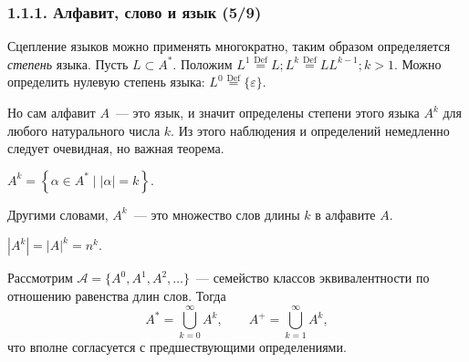 \documentclass[mathserif,12pt,aspectratio=169]{beamer}
\renewcommand{\index}[1]{}
\def\odmkey#1#2{{\it\color{red} #1}\index{#2}}
\def\Set#1#2{\left\{ #1 \mid #2 \right\}}
\def\Def{\stackrel{\text{Def}}{=}}
\let\cal\mathcal
\begin{document}
\begin{frame}
\frametitle{1.1.1. Алфавит, слово и язык (5/9)}
Сцепление языков можно применять многократно,
таким образом определяется \odmkey{степень}{Степень!слова} языка. Пусть $L\subset A^*$. Положим
$L^1 \Def L; L^k\Def L L^{k-1}; k>1$. Можно 
определить нулевую степень языка:
$L^0 \Def \{\varepsilon\}$.

Но сам алфавит $A$~--- это язык,
и значит определены степени этого языка $A^k$
для любого натурального числа $k$. 
Из этого наблюдения и определений
немедленно следует очевидная, 
но важная теорема.

\begin{theorem}
$A^k=\Set{\alpha\in A^*}{|\alpha|=k}$.
\end{theorem}

\begin{remark}
Другими словами, $A^k$~--- это множество слов длины $k$ в алфавите $A$.
\end{remark}

\begin{corollary}
$|A^k|=|A|^k =n^k.$
\end{corollary} 

Рассмотрим $\cal{A} = \{ A^0, A^1, A^2, \dots\}$~--- семейство классов эквивалентности
по отношению равенства длин слов. Тогда
$$A^* = \bigcup_{k=0}^\infty A^k, \qquad
A^+ = \bigcup_{k=1}^\infty A^k,$$
что вполне согласуется с предшествующими определениями.
\end{frame}
\end{document}
